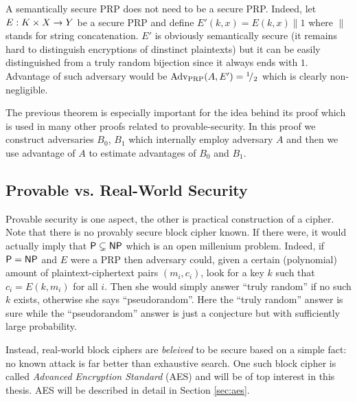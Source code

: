 \begin{note}
	A semantically secure PRP does not need to be a secure PRP. Indeed, let $E: K\times X\rightarrow Y$ be a secure PRP and define $E'(k,x) = E(k,x)\|1$ where $\|$ stands for string concatenation. $E'$ is obviously semantically secure (it remains hard to distinguish encryptions of dinstinct plaintexts) but it can be easily distinguished from a truly random bijection since it always ends with $1$. Advantage of such adversary would be $\operatorname*{Adv_{PRP}}(A,E') = {}^{1}\!/_{2}$ which is clearly non-negligible.
\end{note}

The previous theorem is especially important for the idea behind its proof which is used in many other proofs related to provable-security. In this proof we construct adversaries $B_0$, $B_1$ which internally employ adversary $A$ and then we use advantage of $A$ to estimate advantages of $B_0$ and $B_1$.


\subsection{Provable vs. Real-World Security}

Provable security is one aspect, the other is practical construction of a cipher. Note that there is no provably secure block cipher known. If there were, it would actually imply that $\mathsf{P} \subsetneq \mathsf{NP}$ which is an open millenium problem. Indeed, if $\mathsf{P} = \mathsf{NP}$ and $E$ were a PRP then adversary could, given a certain (polynomial) amount of plaintext-ciphertext pairs $(m_i,c_i)$, look for a key $k$ such that $c_i = E(k,m_i)$ for all $i$. Then she would simply answer ``truly random'' if no such $k$ exists, otherwise she says ``pseudorandom''. Here the ``truly random'' answer is sure while the ``pseudorandom'' answer is just a conjecture but with sufficiently large probability.

Instead, real-world block ciphers are {\em beleived} to be secure based on a simple fact: no known attack is far better than exhaustive search. One such block cipher is called {\em Advanced Encryption Standard} (AES) and will be of top interest in this thesis. AES will be described in detail in Section \ref{sec:aes}.



